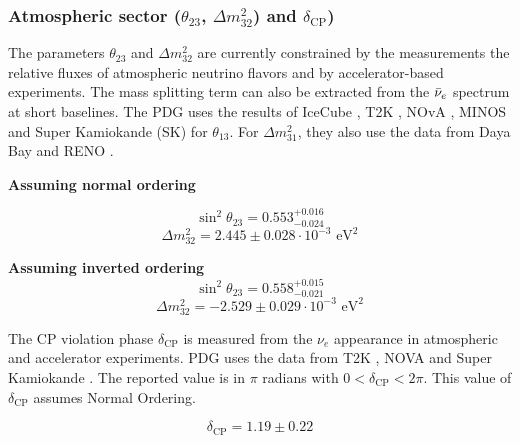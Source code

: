 \documentclass[../main.tex]{subfiles}
\begin{document}
\subsubsection{Atmospheric sector ($\theta_{23}$, $\Delta m^2_{32}$) and $\delta_{\text{CP}}$)}

The parameters $\theta_{23}$ and $\Delta m^2_{32}$ are currently constrained by the measurements the relative fluxes of atmospheric neutrino flavors and by accelerator-based experiments. The mass splitting term can also be extracted from the $\bar{\nu}_{e}$ spectrum at short baselines. The PDG uses the results of IceCube \cite{icecube_collaboration_measurement_2023}, T2K \cite{abe_measurements_2023}, NOvA \cite{the_nova_collaboration_improved_2022}, MINOS \cite{minos_collaboration_precision_2020} and Super Kamiokande (SK) \cite{super-kamiokande_collaboration_atmospheric_2018} for $\theta_{13}$. For $\Delta m^2_{31}$, they also use the data from Daya Bay \cite{daya_bay_collaboration_precision_2023} and RENO \cite{reno_collaboration_measurement_2018}.

\textbf{Assuming normal ordering}

\begin{equation*}
  \sin^2\theta_{23} = 0.553^{+0.016}_{-0.024}
\end{equation*}
\begin{equation*}
  \Delta m^2_{32} = 2.445 \pm 0.028 \cdot 10^{-3} \text{ eV}^2
\end{equation*}

\textbf{Assuming inverted ordering}
\begin{equation*}
  \sin^2\theta_{23} = 0.558^{+0.015}_{-0.021}
\end{equation*}
\begin{equation*}
  \Delta m^2_{32} = -2.529 \pm 0.029 \cdot 10^{-3} \text{ eV}^2
\end{equation*}

The CP violation phase $\delta_{\text{CP}}$ is measured from the $\nu_e$ appearance in atmospheric and accelerator experiments. PDG uses the data from T2K \cite{abe_measurements_2023}, NOVA \cite{the_nova_collaboration_improved_2022} and Super Kamiokande \cite{super-kamiokande_collaboration_atmospheric_2018}. The reported value is in $\pi$ radians with $0 < \delta_{\text{CP}} < 2 \pi$. This value of $\delta_{\text{CP}}$ assumes Normal Ordering.

\begin{equation*}
  \delta_{\text{CP}} = 1.19 \pm 0.22
\end{equation*}
\end{document}

